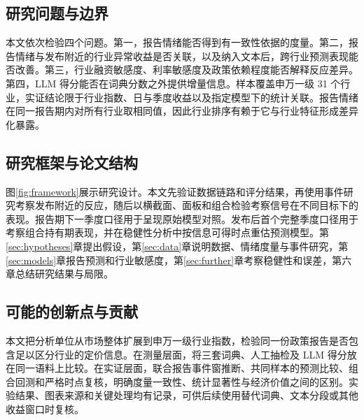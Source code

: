 \subsection{研究问题与边界}

本文依次检验四个问题。第一，报告情绪能否得到有一致性依据的度量。第二，报告情绪与发布附近的行业异常收益是否关联，以及纳入文本后，跨行业预测表现能否改善。第三，行业融资敏感度、利率敏感度及政策依赖程度能否解释反应差异。第四，LLM 得分能否在词典分数之外提供增量信息。样本覆盖申万一级 31 个行业，实证结论限于行业指数、日与季度收益以及指定模型下的统计关联。报告情绪在同一报告期内对所有行业取相同值，因此行业排序有赖于它与行业特征形成差异化暴露。

\subsection{研究框架与论文结构}

图\ref{fig:framework}展示研究设计。本文先验证数据链路和评分结果，再使用事件研究考察发布附近的反应，随后以横截面、面板和组合检验考察信号在不同目标下的表现。报告期下一季度口径用于呈现原始模型对照。发布后首个完整季度口径用于考察组合持有期表现，并在稳健性分析中按信息可得时点重估预测模型。第\ref{sec:hypotheses}章提出假设，第\ref{sec:data}章说明数据、情绪度量与事件研究，第\ref{sec:models}章报告预测和行业敏感度，第\ref{sec:further}章考察稳健性和误差，第六章总结研究结果与局限。


\subsection{可能的创新点与贡献}

本文把分析单位从市场整体扩展到申万一级行业指数，检验同一份政策报告是否包含足以区分行业的定价信息。在测量层面，将三套词典、人工抽检及 LLM 得分放在同一语料上比较。在实证层面，联合报告事件窗推断、共同样本的预测比较、组合回测和严格时点复核，明确度量一致性、统计显著性与经济价值之间的区别。实验结果、图表来源和关键处理均有记录，可供后续使用替代词典、文本分段或其他收益窗口时复核。
